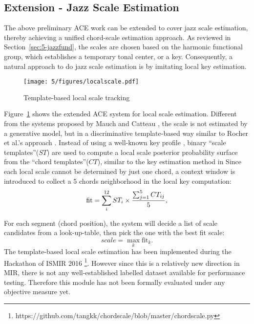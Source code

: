 \subsection{Extension - Jazz Scale Estimation}
The above preliminary ACE work can be extended to cover jazz scale estimation, thereby achieving a unified chord-scale estimation approach. As reviewed in Section~\ref{sec:5-jazzfund}, the scales are chosen based on the harmonic functional group, which establishes a temporary tonal center, or a key. Consequently, a natural approach to do jazz scale estimation is by imitating local key estimation.
\begin{figure}[htb]
    \centering
        \texttt{[image: 5/figures/localscale.pdf]}
    \caption{Template-based local scale tracking}
    \label{fig:5-localscale}
\end{figure}
Figure~\ref{fig:5-localscale} shows the extended ACE system for local scale estimation. Different from the systems proposed by Mauch \cite{mauch2010simultaneous} and Catteau \cite{catteau2007probabilistic}, the scale is not estimated by a generative model, but in a discriminative template-based way similar to Rocher et al.'s approach \cite{rocher2010concurrent}. Instead of using a well-known key profile \cite{temperley2004cognition}, binary ``scale templates''($ST$) are used to compute a local scale posterior probability surface from the ``chord templates''($CT$), similar to the key estimation method in \cite{hu2015safedj} Since each local scale cannot be determined by just one chord, a context window is introduced to collect a 5 chords neighborhood in the local key computation:
\begin{equation}
\text{fit} = \sum_i^{12} ST_i \times {\sum_{j=1}^5 CT_{ij} \over 5},
\end{equation}

For each segment (chord position), the system will decide a list of scale candidates from a look-up-table, then pick the one with the best fit scale:
\begin{equation}
scale = \max_k \text{fit}_k.
\end{equation}
The template-based local scale estimation has been implemented during the Hackathon of ISMIR 2016 \footnote{https://github.com/tangkk/chordscale/blob/master/chordscale.py}. However since this is a relatively new direction in MIR, there is not any well-established labelled dataset available for performance testing. Therefore this module has not been formally evaluated under any objective measure yet.

